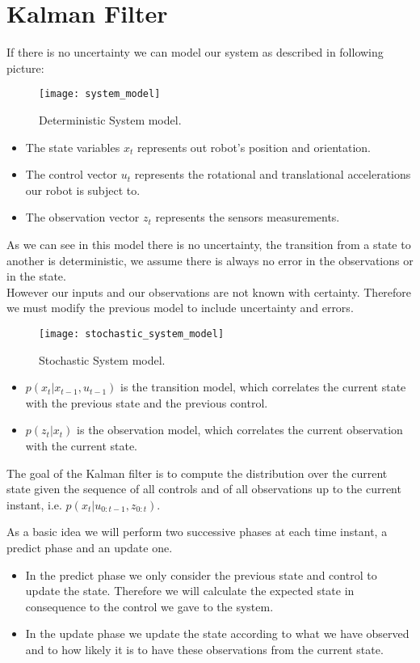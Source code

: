 \chapter{Kalman Filter}
If there is no uncertainty we can model our system as described in following picture:
\begin{figure}[!ht]
	\texttt{[image: system\_model]}
	\captionsetup{justification=centering, margin=1.5cm}
	\centering
	\caption{Deterministic System model.}
	\centering
\end{figure}
\begin{itemize}
	\item The state variables $x_t$ represents out robot's position and orientation.
	\item The control vector $u_t$ represents the rotational and translational accelerations our robot is subject to.
	\item The observation vector $z_t$ represents the sensors measurements.
\end{itemize}
As we can see in this model there is no uncertainty, the transition from a state to another is deterministic, we assume there is always no error in the observations or in the state.\\

However our inputs and our observations are not known with certainty. Therefore we must modify the previous model to include uncertainty and errors.
\begin{figure}[!ht]
	\texttt{[image: stochastic\_system\_model]}
	\captionsetup{justification=centering, margin=1.5cm}
	\centering
	\caption{Stochastic System model.}
	\centering
\end{figure}
\begin{itemize}
	\item $p(x_t | x_{t-1}, u_{t-1})$ is the transition model, which correlates the current state with the previous state and the previous control.
	\item $p(z_t | x_t)$ is the observation model, which correlates the current observation with the current state.
\end{itemize}

The goal of the Kalman filter is to compute the distribution over the current state given the sequence of all controls and of all observations up to the current instant, i.e. $p(x_t | u_{0:t-1}, z_{0:t})$.

As a basic idea we will perform two successive phases at each time instant, a predict phase and an update one.
\begin{itemize}
	\item In the predict phase we only consider the previous state and control to update the state. Therefore we will calculate the expected state in consequence to the control we gave to the system.
	\item In the update phase we update the state according to what we have observed and to how likely it is to have these observations from the current state.
\end{itemize}

